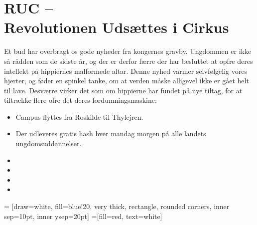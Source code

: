

\begin{minipage}[b]{0.95\linewidth}
\begin{minipage}[t]{0.47\textwidth}
\vspace{3mm}
\section*{RUC -- \\ Revolutionen Udsættes i Cirkus}
Et bud har overbragt os gode nyheder fra kongernes gravby. Ungdommen er ikke så rådden som de sidste år, og der er derfor færre der har besluttet at opfre deres intellekt på hippiernes malformede altar. Denne nyhed varmer selvfølgelig vores hjerter, og føder en spinkel tanke, om at verden måske alligevel ikke er gået helt til lave. Desværre virker det som om hippierne har fundet på nye tiltag, for at tiltrække flere ofre det deres fordumningsmaskine:
\begin{itemize}
\item Campus flyttes fra Roskilde til Thylejren.
\item Der udleveres gratis hash hver mandag morgen på alle landets ungdomsuddannelser.
\item
\item
\item
\item
\end{itemize}

\end{minipage}
\hfill\begin{minipage}[t]{0.47\textwidth}

\vspace{1mm}
 = [draw=white, fill=blue!20, very thick,
    rectangle, rounded corners, inner sep=10pt, inner ysep=20pt]
 =[fill=red, text=white]

%


\end{minipage}
\end{minipage}
